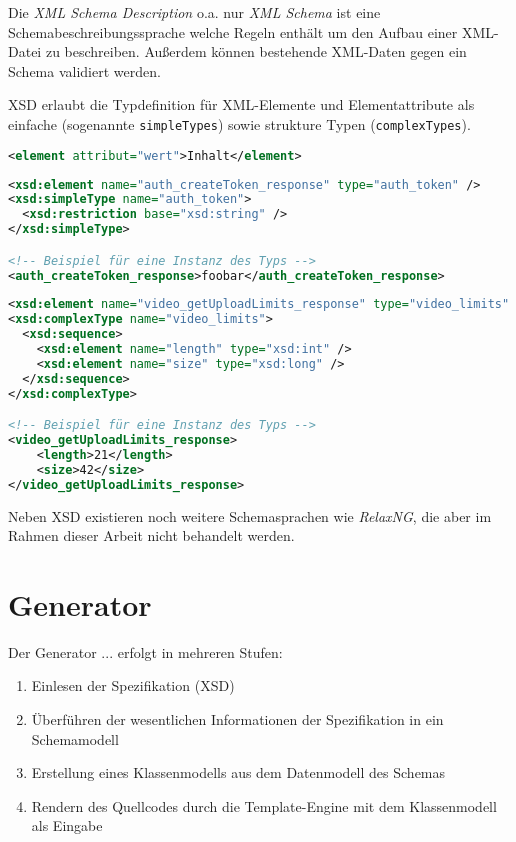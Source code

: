 \documentclass[a4paper]{scrartcl}
\begin{document}
    Die \emph{XML Schema Description} o.a. nur \emph{XML Schema} ist eine Schemabeschreibungssprache welche Regeln enthält um den Aufbau einer XML-Datei zu beschreiben. Außerdem können bestehende XML-Daten gegen ein Schema validiert werden.

    XSD erlaubt die Typdefinition für XML-Elemente und Elementattribute als einfache (sogenannte \texttt{simpleTypes}) sowie strukture Typen (\texttt{complexTypes}).

    \begin{lstlisting}[language=XML, caption=Minimalbeispiel für ein XML-Element]
<element attribut="wert">Inhalt</element>
    \end{lstlisting}

    \begin{lstlisting}[language=XML, label=lst:simple, caption=Beispiel für einen einfachen Schematyp \cite{facebookXSD}]
<xsd:element name="auth_createToken_response" type="auth_token" />
<xsd:simpleType name="auth_token">
  <xsd:restriction base="xsd:string" />
</xsd:simpleType>

<!-- Beispiel für eine Instanz des Typs -->
<auth_createToken_response>foobar</auth_createToken_response>
    \end{lstlisting}

    \begin{lstlisting}[language=XML, label=lst:complex, caption=Beispiel für einen strukturierten Schematyp \cite{facebookXSD}]
<xsd:element name="video_getUploadLimits_response" type="video_limits" />
<xsd:complexType name="video_limits">
  <xsd:sequence>
    <xsd:element name="length" type="xsd:int" />
    <xsd:element name="size" type="xsd:long" />
  </xsd:sequence>
</xsd:complexType>

<!-- Beispiel für eine Instanz des Typs -->
<video_getUploadLimits_response>
    <length>21</length>
    <size>42</size>
</video_getUploadLimits_response>
    \end{lstlisting}

    Neben \gls{XSD} existieren noch weitere Schemasprachen wie \emph{RelaxNG}, die aber im Rahmen dieser Arbeit nicht behandelt werden.

    \section{Generator}

    Der Generator ... erfolgt in mehreren Stufen:

    \begin{enumerate}
        \item Einlesen der Spezifikation (\gls{XSD})
        \item Überführen der wesentlichen Informationen der Spezifikation in ein Schemamodell
        \item Erstellung eines Klassenmodells aus dem Datenmodell des Schemas
        \item Rendern des Quellcodes durch die Template-Engine mit dem Klassenmodell als Eingabe
    \end{enumerate}
\end{document}

